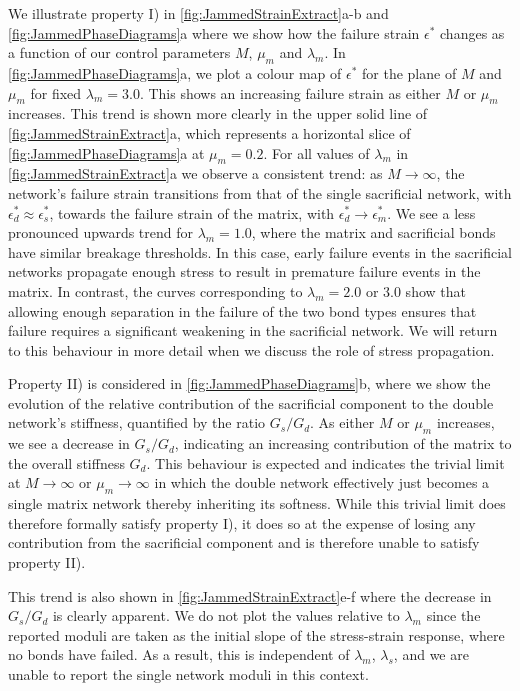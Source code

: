 \documentclass[asymmetricmargins]{library/duthesis}%
\begin{document}
We illustrate property I) in \cref{fig:JammedStrainExtract}a-b and \cref{fig:JammedPhaseDiagrams}a where we show how the failure strain $\epsilon^*$ changes as a function of our control parameters $M$, $\mu_m$ and $\lambda_m$. In \cref{fig:JammedPhaseDiagrams}a, we plot a colour map of $\epsilon^*$ for the plane of $M$ and $\mu_m$ for fixed $\lambda_m=3.0$. This shows an increasing failure strain as either $M$ or $\mu_m$ increases. This trend is shown more clearly in the upper solid line of \cref{fig:JammedStrainExtract}a, which represents a horizontal slice of \cref{fig:JammedPhaseDiagrams}a at $\mu_m=0.2$. For all values of $\lambda_m$ in \cref{fig:JammedStrainExtract}a we observe a consistent trend: as $M \to \infty$, the network's failure strain transitions from that of the single sacrificial network, with $\epsilon^*_d \approx \epsilon^*_s$, towards the failure strain of the matrix, with $\epsilon_d^* \to \epsilon_m^*$. We see a less pronounced upwards trend for $\lambda_m=1.0$, where the matrix and sacrificial bonds have similar breakage thresholds. In this case, early failure events in the sacrificial networks propagate enough stress to result in premature failure events in the matrix. In contrast, the curves corresponding to $\lambda_m=2.0$ or $3.0$ show that allowing enough separation in the failure of the two bond types ensures that failure requires a significant weakening in the sacrificial network. We will return to this behaviour in more detail when we discuss the role of stress propagation.

Property II) is considered in \cref{fig:JammedPhaseDiagrams}b, where we show the evolution of the relative contribution of the sacrificial component to the double network's stiffness, quantified by the ratio $G_s/G_d$. As either $M$ or $\mu_m$ increases, we see a decrease in $G_s/G_d$, indicating an increasing contribution of the matrix to the overall stiffness $G_d$. This behaviour is expected and indicates the trivial limit at $M \to \infty$ or $\mu_m \to \infty$ in which the double network effectively just becomes a single matrix network thereby inheriting its softness. While this trivial limit does therefore formally satisfy property I), it does so at the expense of losing any contribution from the sacrificial component and is therefore unable to satisfy property II).

This trend is also shown in \cref{fig:JammedStrainExtract}e-f where the decrease in $G_s/G_d$ is clearly apparent. We do not plot the values relative to $\lambda_m$ since the reported moduli are taken as the initial slope of the stress-strain response, where no bonds have failed. As a result, this is independent of $\lambda_m$, $\lambda_s$, and we are unable to report the single network moduli in this context. 
\end{document}
